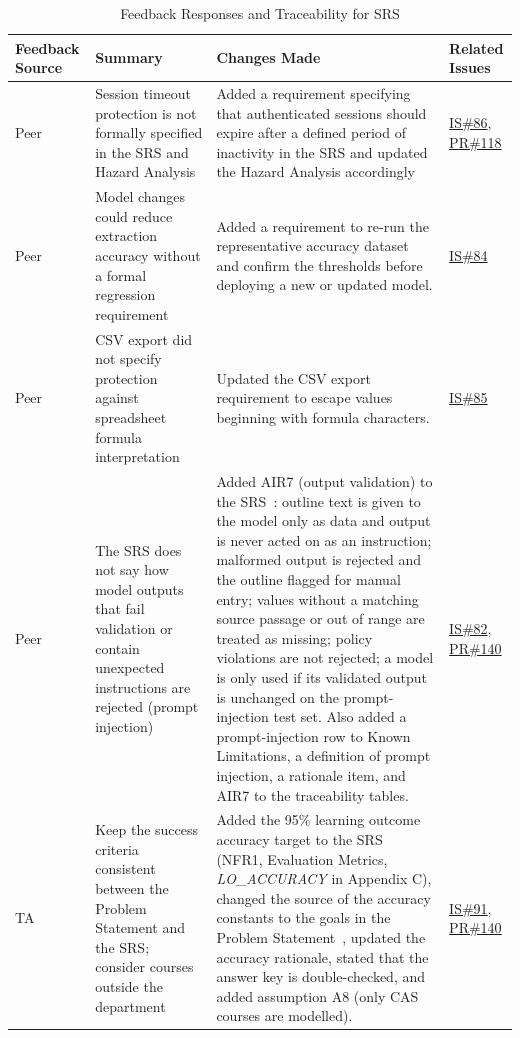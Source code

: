 \documentclass{article}
\begin{document}
\begin{longtable}{|p{2cm}|p{4cm}|p{5cm}|p{4cm}|}
\caption{Feedback Responses and Traceability for SRS}
\label{Tbl-SRS}\\

\hline
\textbf{Feedback Source} & \textbf{Summary} & \textbf{Changes Made} & \textbf{Related Issues} \\ 
\hline
\endhead

Peer & Session timeout protection is not formally specified in the SRS and Hazard Analysis & Added a requirement specifying that authenticated sessions should expire after a defined period of inactivity in the SRS and updated the Hazard Analysis accordingly & \href{https://github.com/shivyam/cas-course-optimization/issues/86}{IS\#86}, \href{https://github.com/shivyam/cas-course-optimization/pull/118}{PR\#118} \\
\hline
Peer & Model changes could reduce extraction accuracy without a formal regression requirement & Added a requirement to re-run the representative accuracy dataset and confirm the thresholds before deploying a new or updated model. & \href{https://github.com/shivyam/cas-course-optimization/issues/84}{IS\#84} \\
\hline
Peer & CSV export did not specify protection against spreadsheet formula interpretation & Updated the CSV export requirement to escape values beginning with formula characters. & \href{https://github.com/shivyam/cas-course-optimization/issues/85}{IS\#85} \\
\hline
Peer & The SRS does not say how model outputs that fail validation or contain unexpected instructions are rejected (prompt injection) & Added AIR7 (output validation) to the SRS~\citep{TeamBVSH2026SRS}: outline text is given to the model only as data and output is never acted on as an instruction; malformed output is rejected and the outline flagged for manual entry; values without a matching source passage or out of range are treated as missing; policy violations are not rejected; a model is only used if its validated output is unchanged on the prompt-injection test set. Also added a prompt-injection row to Known Limitations, a definition of prompt injection, a rationale item, and AIR7 to the traceability tables. & \href{https://github.com/shivyam/cas-course-optimization/issues/82}{IS\#82}, \href{https://github.com/shivyam/cas-course-optimization/pull/140}{PR\#140} \\
\hline
TA & Keep the success criteria consistent between the Problem Statement and the SRS; consider courses outside the department & Added the 95\% learning outcome accuracy target to the SRS~\citep{TeamBVSH2026SRS} (NFR1, Evaluation Metrics, \textit{LO\_ACCURACY} in Appendix C), changed the source of the accuracy constants to the goals in the Problem Statement~\citep{TeamBVSH2026PS}, updated the accuracy rationale, stated that the answer key is double-checked, and added assumption A8 (only CAS courses are modelled). & \href{https://github.com/shivyam/cas-course-optimization/issues/91}{IS\#91}, \href{https://github.com/shivyam/cas-course-optimization/pull/140}{PR\#140} \\

\end{longtable}
\end{document}
